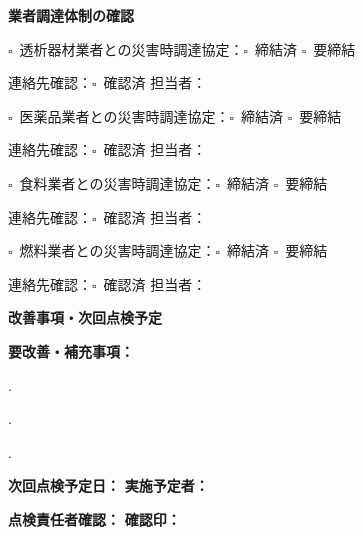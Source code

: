 \documentclass[a4paper,12pt]{jarticle}
\newcommand{\checkbox}{$\square$\ }
\newcommand{\underlinespace}[1]{\underline{\hspace{#1}}}
\begin{document}
\begin{center}
\textbf{\large 業者調達体制の確認}
\end{center}

\vspace{3mm}

\noindent
\checkbox 透析器材業者との災害時調達協定：\checkbox 締結済 \quad \checkbox 要締結

\vspace{2mm}

\noindent
連絡先確認：\checkbox 確認済 \quad 担当者：\underlinespace{6cm}

\vspace{3mm}

\noindent
\checkbox 医薬品業者との災害時調達協定：\checkbox 締結済 \quad \checkbox 要締結

\vspace{2mm}

\noindent
連絡先確認：\checkbox 確認済 \quad 担当者：\underlinespace{6cm}

\vspace{3mm}

\noindent
\checkbox 食料業者との災害時調達協定：\checkbox 締結済 \quad \checkbox 要締結

\vspace{2mm}

\noindent
連絡先確認：\checkbox 確認済 \quad 担当者：\underlinespace{6cm}

\vspace{3mm}

\noindent
\checkbox 燃料業者との災害時調達協定：\checkbox 締結済 \quad \checkbox 要締結

\vspace{2mm}

\noindent
連絡先確認：\checkbox 確認済 \quad 担当者：\underlinespace{6cm}

\vspace{8mm}

\begin{center}
\textbf{\large 改善事項・次回点検予定}
\end{center}

\vspace{3mm}

\noindent
\textbf{要改善・補充事項：}

\vspace{2mm}

. \underlinespace{12cm}

\vspace{2mm}

. \underlinespace{12cm}

\vspace{2mm}

. \underlinespace{12cm}

\vspace{3mm}

\noindent
\textbf{次回点検予定日：} \underlinespace{4cm} \quad \textbf{実施予定者：} \underlinespace{4cm}

\vspace{3mm}

\noindent
\textbf{点検責任者確認：} \underlinespace{4cm} \quad \textbf{確認印：} \underlinespace{3cm}
\end{document}
